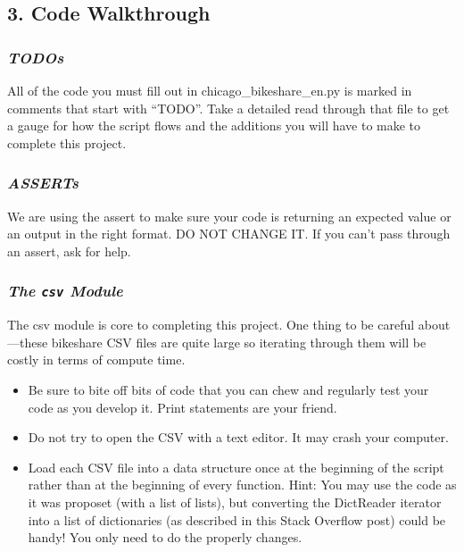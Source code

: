 \documentclass[]{book}
\providecommand{\tightlist}{%
  \setlength{\itemsep}{0pt}\setlength{\parskip}{0pt}}
\begin{document}
\subsection{3. Code Walkthrough}\label{code-walkthrough}

\subsubsection{\texorpdfstring{\emph{TODOs}}{TODOs}}\label{todos}

All of the code you must fill out in chicago\_bikeshare\_en.py is marked
in comments that start with ``TODO''. Take a detailed read through that
file to get a gauge for how the script flows and the additions you will
have to make to complete this project.

\subsubsection{\texorpdfstring{\emph{ASSERTs}}{ASSERTs}}\label{asserts}

We are using the assert to make sure your code is returning an expected
value or an output in the right format. DO NOT CHANGE IT. If you can't
pass through an assert, ask for help.

\subsubsection{\texorpdfstring{\emph{The \texttt{csv}
Module}}{The csv Module}}\label{the-csv-module}

The csv module is core to completing this project. One thing to be
careful about---these bikeshare CSV files are quite large so iterating
through them will be costly in terms of compute time.

\begin{itemize}
\tightlist
\item
  Be sure to bite off bits of code that you can chew and regularly test
  your code as you develop it. Print statements are your friend.
\item
  Do not try to open the CSV with a text editor. It may crash your
  computer.
\item
  Load each CSV file into a data structure once at the beginning of the
  script rather than at the beginning of every function. Hint: You may
  use the code as it was proposet (with a list of lists), but converting
  the DictReader iterator into a list of dictionaries (as described in
  this Stack Overflow post) could be handy! You only need to do the
  properly changes.
\end{itemize}
\end{document}
